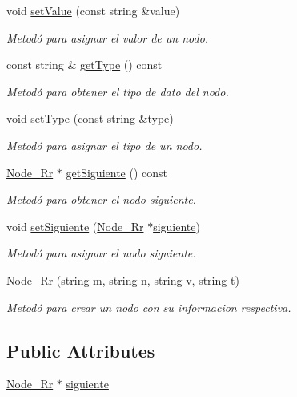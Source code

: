 \begin{DoxyCompactItemize}
void \hyperlink{classNode__Rr_a14be87ad7d1dd19daafe9834c2e3383e}{set\+Value} (const string \&value)
\begin{DoxyCompactList}\small\item\em Metodó para asignar el valor de un nodo. \end{DoxyCompactList}\item 
const string \& \hyperlink{classNode__Rr_a5b5c76b32dd66cd76de1e411ff6693e0}{get\+Type} () const 
\begin{DoxyCompactList}\small\item\em Metodó para obtener el tipo de dato del nodo. \end{DoxyCompactList}\item 
void \hyperlink{classNode__Rr_ac9066919132071d5e5226494918251ff}{set\+Type} (const string \&type)
\begin{DoxyCompactList}\small\item\em Metodó para asignar el tipo de un nodo. \end{DoxyCompactList}\item 
\hyperlink{classNode__Rr}{Node\+\_\+\+Rr} $\ast$ \hyperlink{classNode__Rr_a5ced469794c9c5d1789f82ff9ec73ae2}{get\+Siguiente} () const 
\begin{DoxyCompactList}\small\item\em Metodó para obtener el nodo siguiente. \end{DoxyCompactList}\item 
void \hyperlink{classNode__Rr_afb18a4a54ebc503717c0a08447999cdb}{set\+Siguiente} (\hyperlink{classNode__Rr}{Node\+\_\+\+Rr} $\ast$\hyperlink{classNode__Rr_af7cc22fe5683d133dfb60a14af581120}{siguiente})
\begin{DoxyCompactList}\small\item\em Metodó para asignar el nodo siguiente. \end{DoxyCompactList}\item 
\hyperlink{classNode__Rr_a9d35ff2b95a306ef609adf189a0625a5}{Node\+\_\+\+Rr} (string m, string n, string v, string t)
\begin{DoxyCompactList}\small\item\em Metodó para crear un nodo con su informacion respectiva. \end{DoxyCompactList}\end{DoxyCompactItemize}
\subsection*{Public Attributes}
\begin{DoxyCompactItemize}
\item 
\hyperlink{classNode__Rr}{Node\+\_\+\+Rr} $\ast$ \hyperlink{classNode__Rr_af7cc22fe5683d133dfb60a14af581120}{siguiente}
\end{DoxyCompactItemize}


